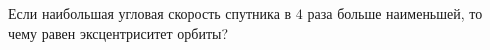Если наибольшая угловая скорость спутника в $4$ раза больше наименьшей,
то чему равен эксцентриситет орбиты?
